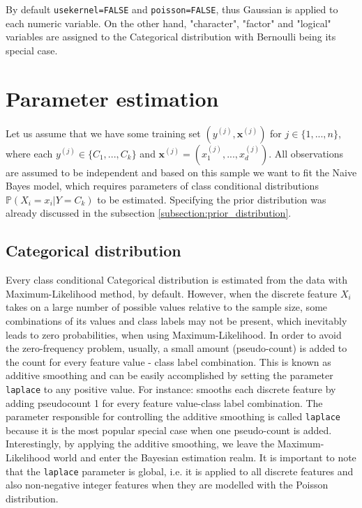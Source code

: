 \documentclass{article}\usepackage[]{graphicx}\usepackage[]{color}
\begin{document}
By default \texttt{usekernel=FALSE} and \texttt{poisson=FALSE}, thus Gaussian is applied to each numeric variable. On the other hand, "character", "factor" and "logical" variables are assigned to the Categorical distribution with Bernoulli being its special case.


\section{Parameter estimation}

Let us assume that we have some training set $(y^{(j)}, \boldsymbol{x}^{(j)})$ for $j \in \{1,...,n\}$, where each $y^{(j)} \in \{C_1,...,C_k\}$ and $\boldsymbol{x}^{(j)} = (x^{(j)}_1,...,x^{(j)}_d)$. All observations are assumed to be independent and based on this sample we want to fit the Naive Bayes model, which requires parameters of class conditional distributions $\mathbb{P}(X_i = x_i | Y = C_k)$ to be estimated. Specifying the prior distribution was already discussed in the subsection \ref{subsection:prior_distribution}.


\subsection{Categorical distribution}

Every class conditional Categorical distribution is estimated from the data with Maximum-Likelihood method, by default. However, when the discrete feature $X_i$ takes on a large number of possible values relative to the sample size, some combinations of its values and class labels may not be present, which inevitably leads to zero probabilities, when using Maximum-Likelihood. In order to avoid the zero-frequency problem, usually, a small amount (pseudo-count) is added to the count for every feature value - class label combination. This is known as additive smoothing and can be easily accomplished by setting the parameter \texttt{laplace} to any positive value. For instance: \textcolor{darkgreen}{{}} smooths each discrete feature by adding pseudocount 1 for every feature value-class label combination. The parameter responsible for controlling the additive smoothing is called \texttt{laplace} because it is the most popular special case when one pseudo-count is added. Interestingly, by applying the additive smoothing, we leave the Maximum-Likelihood world and enter the Bayesian estimation realm. It is important to note that the \texttt{laplace} parameter is global, i.e. it is applied to all discrete features and also non-negative integer features when they are modelled with the Poisson distribution.
\end{document}

